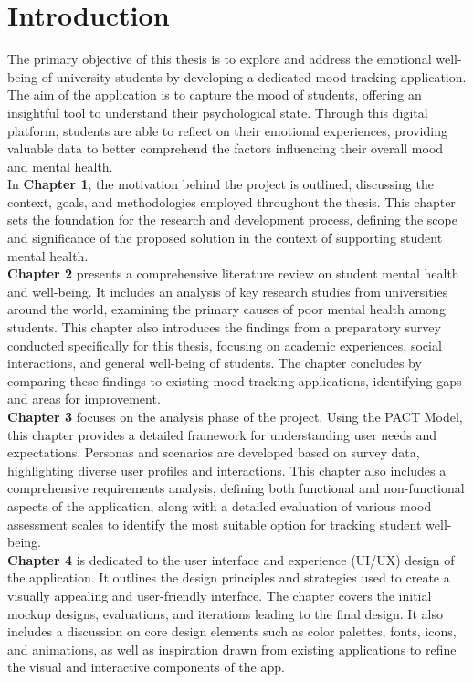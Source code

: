 \chapter{Introduction}

The primary objective of this thesis is to explore and address the emotional well-being of university students by developing a dedicated mood-tracking application. The aim of the application is to capture the mood of students, offering an insightful tool to understand their psychological state. Through this digital platform, students are able to reflect on their emotional experiences, providing valuable data to better comprehend the factors influencing their overall mood and mental health.\vspace{5mm} \\
In \textbf{Chapter 1}, the motivation behind the project is outlined, discussing the context, goals, and methodologies employed throughout the thesis. This chapter sets the foundation for the research and development process, defining the scope and significance of the proposed solution in the context of supporting student mental health.\vspace{5mm} \\
\textbf{Chapter 2} presents a comprehensive literature review on student mental health and well-being. It includes an analysis of key research studies from universities around the world, examining the primary causes of poor mental health among students. This chapter also introduces the findings from a preparatory survey conducted specifically for this thesis, focusing on academic experiences, social interactions, and general well-being of students. The chapter concludes by comparing these findings to existing mood-tracking applications, identifying gaps and areas for improvement.\vspace{5mm} \\
\textbf{Chapter 3} focuses on the analysis phase of the project. Using the PACT Model, this chapter provides a detailed framework for understanding user needs and expectations. Personas and scenarios are developed based on survey data, highlighting diverse user profiles and interactions. This chapter also includes a comprehensive requirements analysis, defining both functional and non-functional aspects of the application, along with a detailed evaluation of various mood assessment scales to identify the most suitable option for tracking student well-being.\vspace{5mm} \\
\textbf{Chapter 4} is dedicated to the user interface and experience (UI/UX) design of the application. It outlines the design principles and strategies used to create a visually appealing and user-friendly interface. The chapter covers the initial mockup designs, evaluations, and iterations leading to the final design. It also includes a discussion on core design elements such as color palettes, fonts, icons, and animations, as well as inspiration drawn from existing applications to refine the visual and interactive components of the app.\vspace{5mm} \\

